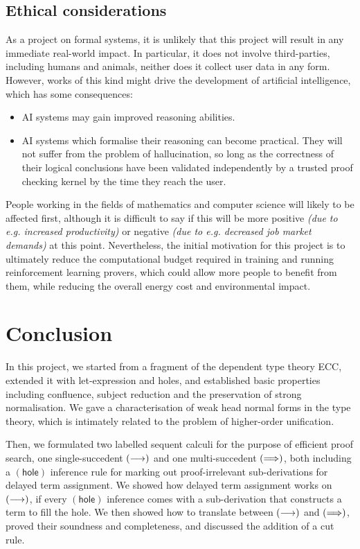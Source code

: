 \documentclass[twoside]{report}
\begin{document}
\section{Ethical considerations}
\label{sec:ethical_considerations}

As a project on formal systems, it is unlikely that this project will result in any immediate real-world impact. In particular, it does not involve third-parties, including humans and animals, neither does it collect user data in any form. However, works of this kind might drive the development of artificial intelligence, which has some consequences:

\begin{itemize}
    \item AI systems may gain improved reasoning abilities.

    \item AI systems which formalise their reasoning can become practical. They will not suffer from the problem of hallucination, so long as the correctness of their logical conclusions have been validated independently by a trusted proof checking kernel by the time they reach the user.
\end{itemize}

People working in the fields of mathematics and computer science will likely to be affected first, although it is difficult to say if this will be more positive \emph{(due to e.g. increased productivity)} or negative \emph{(due to e.g. decreased job market demands)} at this point. Nevertheless, the initial motivation for this project is to ultimately reduce the computational budget required in training and running reinforcement learning provers, which could allow more people to benefit from them, while reducing the overall energy cost and environmental impact.

\chapter{Conclusion}
\label{sec:conclusion}

In this project, we started from a fragment of the dependent type theory ECC, extended it with let-expression and holes, and established basic properties including confluence, subject reduction and the preservation of strong normalisation. We gave a characterisation of weak head normal forms in the type theory, which is intimately related to the problem of higher-order unification.

Then, we formulated two labelled sequent calculi for the purpose of efficient proof search, one single-succedent $(\longrightarrow)$ and one multi-succedent $(\Longrightarrow)$, both including a $(\mathsf{hole})$ inference rule for marking out proof-irrelevant sub-derivations for delayed term assignment. We showed how delayed term assignment works on $(\longrightarrow)$, if every $(\mathsf{hole})$ inference comes with a sub-derivation that constructs a term to fill the hole. We then showed how to translate between $(\longrightarrow)$ and $(\Longrightarrow)$, proved their soundness and completeness, and discussed the addition of a cut rule.
\end{document}
